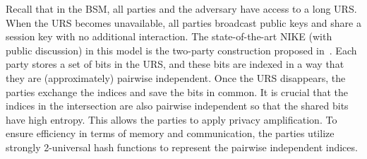 % 
 
 
Recall that in the BSM, all parties and the adversary have access to a long URS. When the URS becomes unavailable, all parties broadcast public keys and share a session key with no additional interaction.
The state-of-the-art NIKE (with public discussion) in this model is the two-party construction proposed in~\cite{C:CacMau97}. Each party stores a set of bits in the URS, and these bits are indexed in a way that they are (approximately) pairwise independent. Once the URS disappears, the parties exchange the indices and save the bits in common. It is crucial that the indices in the intersection are also pairwise independent so that the shared bits have high entropy. This allows the parties to apply privacy amplification.
To ensure efficiency in terms of memory and communication, the parties utilize strongly 2-universal hash functions to represent the pairwise independent indices.

